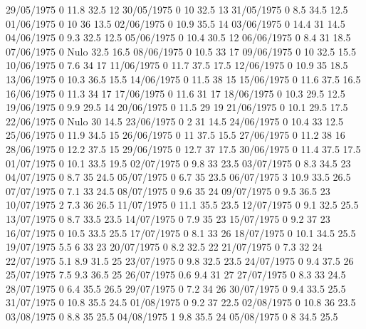 29/05/1975  0      11.8   32.5   12 
30/05/1975  0      10     32.5   13 
31/05/1975  0      8.5    34.5   12.5 
01/06/1975  0      10     36     13.5 
02/06/1975  0      10.9   35.5   14 
03/06/1975  0      14.4   31     14.5 
04/06/1975  0      9.3    32.5   12.5 
05/06/1975  0      10.4   30.5   12 
06/06/1975  0      8.4    31     18.5 
07/06/1975  0     Nulo    32.5   16.5 
08/06/1975  0      10.5   33     17 
09/06/1975  0      10     32.5   15.5 
10/06/1975  0      7.6    34     17 
11/06/1975  0      11.7   37.5   17.5 
12/06/1975  0      10.9   35     18.5 
13/06/1975  0      10.3   36.5   15.5 
14/06/1975  0      11.5   38     15 
15/06/1975  0      11.6   37.5   16.5 
16/06/1975  0      11.3   34     17 
17/06/1975  0      11.6   31     17 
18/06/1975  0      10.3   29.5   12.5 
19/06/1975  0      9.9    29.5   14 
20/06/1975  0      11.5   29     19 
21/06/1975  0      10.1   29.5   17.5 
22/06/1975  0     Nulo    30     14.5 
23/06/1975  0      2      31     14.5 
24/06/1975  0      10.4   33     12.5 
25/06/1975  0      11.9   34.5   15 
26/06/1975  0      11     37.5   15.5 
27/06/1975  0      11.2   38     16 
28/06/1975  0      12.2   37.5   15 
29/06/1975  0      12.7   37     17.5 
30/06/1975  0      11.4   37.5   17.5 
01/07/1975  0      10.1   33.5   19.5 
02/07/1975  0      9.8    33     23.5 
03/07/1975  0      8.3    34.5   23 
04/07/1975  0      8.7    35     24.5 
05/07/1975  0      6.7    35     23.5 
06/07/1975  3      10.9   33.5   26.5 
07/07/1975  0      7.1    33     24.5 
08/07/1975  0      9.6    35     24 
09/07/1975  0      9.5    36.5   23 
10/07/1975  2      7.3    36     26.5 
11/07/1975  0      11.1   35.5   23.5 
12/07/1975  0      9.1    32.5   25.5 
13/07/1975  0      8.7    33.5   23.5 
14/07/1975  0      7.9    35     23 
15/07/1975  0      9.2    37     23 
16/07/1975  0      10.5   33.5   25.5 
17/07/1975  0      8.1    33     26 
18/07/1975  0      10.1   34.5   25.5 
19/07/1975  5.5    6      33     23 
20/07/1975  0      8.2    32.5   22 
21/07/1975  0      7.3    32     24 
22/07/1975  5.1    8.9    31.5   25 
23/07/1975  0      9.8    32.5   23.5 
24/07/1975  0      9.4    37.5   26 
25/07/1975  7.5    9.3    36.5   25 
26/07/1975  0.6    9.4    31     27 
27/07/1975  0      8.3    33     24.5 
28/07/1975  0      6.4    35.5   26.5 
29/07/1975  0      7.2    34     26 
30/07/1975  0      9.4    33.5   25.5 
31/07/1975  0      10.8   35.5   24.5 
01/08/1975  0      9.2    37     22.5 
02/08/1975  0      10.8   36     23.5 
03/08/1975  0      8.8    35     25.5 
04/08/1975  1      9.8    35.5   24 
05/08/1975  0      8      34.5   25.5 
